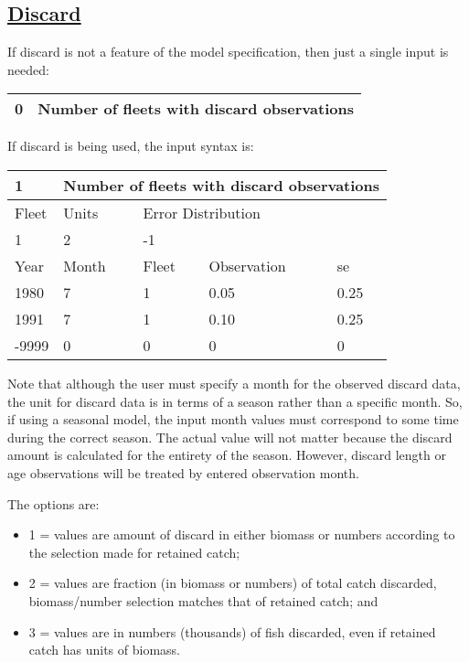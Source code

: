 \hypertarget{Discard}{}
\subsection[Discard]{\protect\hyperlink{Discard}{Discard}}
If discard is not a feature of the model specification, then just a single input is needed:

\begin{center}
	\begin{tabular}{p{2cm} p{13cm}}
		\hline
		0 & Number of fleets with discard observations \Tstrut\Bstrut\\
		\hline
	\end{tabular}
\end{center}
	
	
If discard is being used, the input syntax is:
\begin{center}
	\begin{tabular}{p{2cm} p{3cm} p{3cm} p{3cm} p{3cm}}
		\hline
		1 & \multicolumn{4}{l}{Number of fleets with discard observations} \Tstrut\Bstrut\\
		\hline
		Fleet & Units & \multicolumn{3}{l}{Error Distribution} \Tstrut\Bstrut\\
		\hline
		1 & 2 & \multicolumn{3}{l}{-1} \Tstrut\Bstrut\\
		\hline
		Year & Month & Fleet & Observation & \gls{se} \Tstrut\Bstrut\\
		\hline
		1980  & 7 & 1 & 0.05 & 0.25 \Tstrut\\
		1991  & 7 & 1 & 0.10 & 0.25 \\
		-9999 & 0 & 0 &    0 & 0 \Bstrut\\
		\hline
	\end{tabular}
\end{center}

Note that although the user must specify a month for the observed discard data, the unit for discard data is in terms of a season rather than a specific month. So, if using a seasonal model, the input month values must correspond to some time during the correct season. The actual value will not matter because the discard amount is calculated for the entirety of the season. However, discard length or age observations will be treated by entered observation month.
	
The options are:
\begin{itemize}
	\item 1 = values are amount of discard in either biomass or numbers according to the selection made for retained catch;
	\item 2 = values are fraction (in biomass or numbers) of total catch discarded, biomass/number selection matches that of retained catch; and
	\item 3 = values are in numbers (thousands) of fish discarded, even if retained catch has units of biomass.
\end{itemize}

